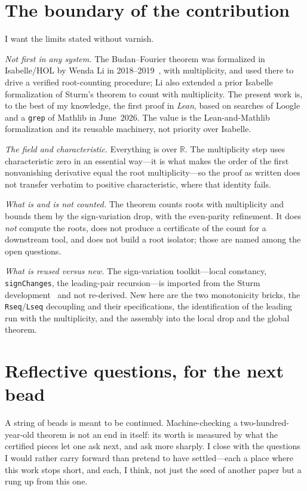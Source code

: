 \documentclass[11pt]{article}
\newcommand{\lean}[1]{\texttt{#1}}
\newcommand{\R}{\mathbb{R}}
\begin{document}
\section{The boundary of the contribution}\label{sec:boundary}

I want the limits stated without varnish.

\emph{Not first in any system.} The Budan--Fourier theorem was formalized in Isabelle/HOL by Wenda
Li in 2018--2019~\cite{liBF}, with multiplicity, and used there to drive a verified root-counting
procedure; Li also extended a prior Isabelle formalization of Sturm's theorem to count with
multiplicity. The present work is, to the best of my knowledge, the first proof in \emph{Lean}, based
on searches of Loogle and a \lean{grep} of Mathlib in June~2026. The value is the Lean-and-Mathlib
formalization and its reusable machinery, not priority over Isabelle.

\emph{The field and characteristic.} Everything is over $\R$. The multiplicity step uses
characteristic zero in an essential way---it is what makes the order of the first nonvanishing
derivative equal the root multiplicity---so the proof as written does not transfer verbatim to
positive characteristic, where that identity fails.

\emph{What is and is not counted.} The theorem counts roots with multiplicity and bounds them by the
sign-variation drop, with the even-parity refinement. It does \emph{not} compute the roots, does not
produce a certificate of the count for a downstream tool, and does not build a root isolator; those are
named among the open questions.

\emph{What is reused versus new.} The sign-variation toolkit---local constancy, \lean{signChanges},
the leading-pair recursion---is imported from the Sturm development~\cite{sturmlean} and not
re-derived. New here are the two monotonicity bricks, the \lean{Rseq}/\lean{Lseq} decoupling and their
specifications, the identification of the leading run with the multiplicity, and the assembly into the
local drop and the global theorem.

\section{Reflective questions, for the next bead}\label{sec:questions}

A string of beads is meant to be continued. Machine-checking a two-hundred-year-old theorem is not an
end in itself: its worth is measured by what the certified pieces let one ask next, and ask more
sharply. I close with the questions I would rather carry forward than pretend to have settled---each a
place where this work stops short, and each, I think, not just the seed of another paper but a rung up
from this one.
\end{document}

